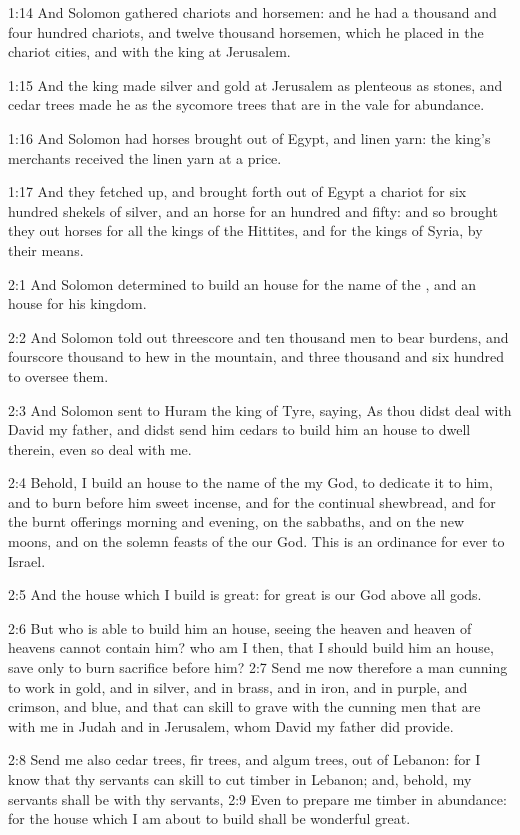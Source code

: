 1:14 And Solomon gathered chariots and horsemen: and he had a thousand and four hundred chariots, and twelve thousand horsemen, which he placed in the chariot cities, and with the king at Jerusalem.

1:15 And the king made silver and gold at Jerusalem as plenteous as stones, and cedar trees made he as the sycomore trees that are in the vale for abundance.

1:16 And Solomon had horses brought out of Egypt, and linen yarn: the king's merchants received the linen yarn at a price.

1:17 And they fetched up, and brought forth out of Egypt a chariot for six hundred shekels of silver, and an horse for an hundred and fifty: and so brought they out horses for all the kings of the Hittites, and for the kings of Syria, by their means.

2:1 And Solomon determined to build an house for the name of the \LORD, and an house for his kingdom.

2:2 And Solomon told out threescore and ten thousand men to bear burdens, and fourscore thousand to hew in the mountain, and three thousand and six hundred to oversee them.

2:3 And Solomon sent to Huram the king of Tyre, saying, As thou didst deal with David my father, and didst send him cedars to build him an house to dwell therein, even so deal with me.

2:4 Behold, I build an house to the name of the \LORD my God, to dedicate it to him, and to burn before him sweet incense, and for the continual shewbread, and for the burnt offerings morning and evening, on the sabbaths, and on the new moons, and on the solemn feasts of the \LORD our God. This is an ordinance for ever to Israel.

2:5 And the house which I build is great: for great is our God above all gods.

2:6 But who is able to build him an house, seeing the heaven and heaven of heavens cannot contain him? who am I then, that I should build him an house, save only to burn sacrifice before him?  2:7 Send me now therefore a man cunning to work in gold, and in silver, and in brass, and in iron, and in purple, and crimson, and blue, and that can skill to grave with the cunning men that are with me in Judah and in Jerusalem, whom David my father did provide.

2:8 Send me also cedar trees, fir trees, and algum trees, out of Lebanon: for I know that thy servants can skill to cut timber in Lebanon; and, behold, my servants shall be with thy servants, 2:9 Even to prepare me timber in abundance: for the house which I am about to build shall be wonderful great.

